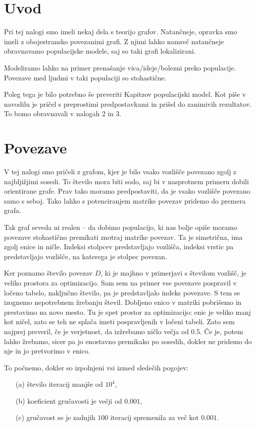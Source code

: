 \documentclass[12pt, a4paper]{article}
\begin{document}
\section{Uvod}

Pri tej nalogi smo imeli nekaj dela s teorijo grafov. Natan\v{c}neje, opravka smo imeli z obojestransko povezanimi
grafi. Z njimi lahko namre\v{c} natan\v{c}neje obravnavamo populacijske modele, saj so taki grafi lokalizirani.

Modeliramo lahko na primer prena\v{s}anje vica/ideje/bolezni preko populacije. Povezave med ljudmi v taki populaciji so
stohasti\v{c}ne.

Poleg tega je bilo potrebno \v{s}e preveriti Kapitzov populacijski model. Kot pi\v{s}e v navodilu je pri\v{c}el s
preprostimi predpostavkami in pri\v{s}el do zanimivih rezultatov. To bomo obravnavali v nalogah 2 in 3.

\section{Povezave}

V tej nalogi smo pri\v celi z grafom, kjer je bilo vsako vozli\v s\v ce povezano zgolj z najblji\v zjimi sosedi. To
\v stevilo mora biti sodo, saj bi v nasprotnem primeru dobili orientirane grafe. Prav tako moramo predpostaviti, da je
vsako vozli\v s\v ce povezano samo s seboj. Tako lahko s potenciranjem matrike povezav pridemo do premera grafa.

Tak graf seveda ni realen -- da dobimo populacijo, ki nas bolje opi\v se moramo povezave stohasti\v cno premikati
znotraj matrike povezav. Ta je simetri\v cna, ima zgolj enice in ni\v cle. Indeksi stolpcev predstavljajo vozli\v s\v ca,
indeksi vrstic pa predstavljajo vozli\v s\v ce, na katerega je stolpec povezan.

Ker poznamo \v stevilo povezav $D$, ki je majhno v primerjavi s \v stevilom vozli\v s\v c, je veliko prostora za
optimizacijo. Sam sem na primer vse povezave pospravil v lo\v ceno tabelo, naklju\v cno \v stevilo, pa je predstavljalo
indeks povezave. S tem se izognemo nepotrebnem \v zrebanju \v stevil. Dobljeno enico v matriki pobri\v semo in prestavimo
na novo mesto. Tu je spet prostor za optimizacijo: enic je veliko manj kot ni\v cel, zato se teh ne spla\v ca imeti
pospravljenih v lo\v ceni tabeli. Zato sem najprej preveril, \v ce je verjetnost, da iz\v zrebamo ni\v clo ve\v cja od
0.5. \v Ce je, potem lahko \v zrebamo, sicer pa jo enostavno premikako po sosedih, dokler ne pridemo do nje in jo
pretvorimo v enico.

To po\v cnemo, dokler so izpolnjeni vsi izmed slede\v cih pogojev:
\begin{itemize}
	\item[(a)]{\v stevilo iteracij manj\v se od $10^4$,}
	\item[(b)]{koeficient gru\v cavosti je ve\v cji od $0.001$,}
	\item[(c)]{gru\v cavost se je zadnjih $100$ iteracij spremenila za ve\v c kot $0.001$.}
\end{itemize}
\end{document}
